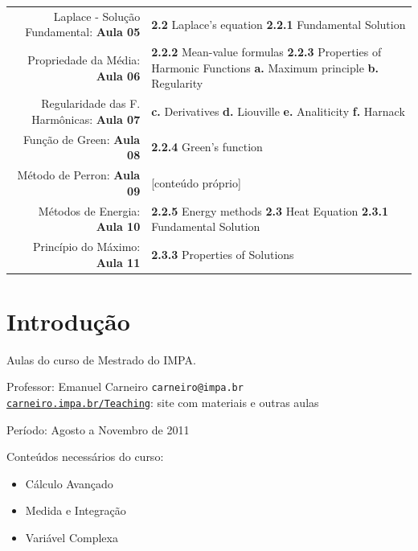 \documentclass[11pt]{article}
\begin{document}
\begin{center}
	\begin{tabular}{r | p{7.5cm}}
		Laplace - Solução Fundamental: \textbf{Aula 05} & \textbf{2.2} Laplace's equation \newline \textbf{2.2.1} Fundamental Solution \\
		Propriedade da Média: \textbf{Aula 06} & \textbf{2.2.2} Mean-value formulas  \newline \textbf{2.2.3} Properties of Harmonic Functions \newline \textbf{a.} Maximum principle \newline \textbf{b.} Regularity \\
		
		Regularidade das F. Harmônicas: \textbf{Aula 07} & \textbf{c.} Derivatives \newline \textbf{d.} Liouville \newline \textbf{e.} Analiticity \newline \textbf{f.} Harnack \\

		Função de Green: \textbf{Aula 08} & \textbf{2.2.4} Green's function \\

		Método de Perron: \textbf{Aula 09} & [conteúdo próprio] \\

		Métodos de Energia: \textbf{Aula 10} & \textbf{2.2.5} Energy methods \newline \textbf{2.3} Heat Equation \newline \textbf{2.3.1} Fundamental Solution \\
		Princípio do Máximo: \textbf{Aula 11} & \textbf{2.3.3} Properties of Solutions
	\end{tabular}
\end{center}



\section{Introdução}
Aulas do curso de Mestrado do IMPA.

Professor: Emanuel Carneiro \texttt{carneiro@impa.br} \\
\href{https://carneiro.impa.br/index.php/Teaching}{\texttt{carneiro.impa.br/Teaching}}: site com materiais e outras aulas

Período: Agosto a Novembro de 2011

Conteúdos necessários do curso:
\begin{itemize}
	\item Cálculo Avançado
	\item Medida e Integração
	\item Variável Complexa
\end{itemize}
\end{document}
